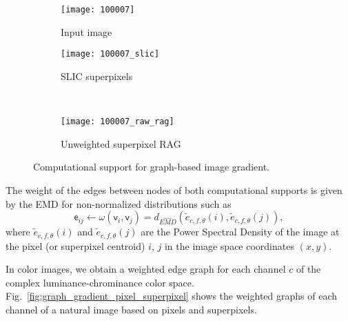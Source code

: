 \begin{figure}[!ht]
    \centering
    \begin{subfigure}[b]{0.49\textwidth}
    	\texttt{[image: 100007]} 
    	\caption{Input image}
    \end{subfigure}    
    \begin{subfigure}[b]{0.49\textwidth}
        \texttt{[image: 100007\_slic]}
        \caption{SLIC superpixels}
    \end{subfigure}\\    
    \begin{subfigure}[b]{0.49\textwidth}
        \texttt{[image: 100007\_raw\_rag]}
        \caption{Unweighted superpixel RAG}
    \end{subfigure}
    
	\caption{Computational support for graph-based image gradient.}\label{fig:computational_support}    
\end{figure}

The weight of the edges between nodes of both computational supports is given by the EMD for non-normalized distributions such as 
\begin{equation}
	\mathsf{e}_{ij} \leftarrow \omega(\mathsf{v}_i, \mathsf{v}_j) = d_{\widehat{EMD}}(\widetilde{e}_{c, f, \theta}(i), \widetilde{e}_{c, f, \theta}(j)),
\end{equation}
where $\widetilde{e}_{c, f, \theta}(i)$ and $\widetilde{e}_{c, f, \theta}(j)$ are the Power Spectral Density of the image at the pixel (or superpixel centroid) $i$, $j$ in the image space coordinates $(x,y)$. 

In color images, we obtain a weighted edge graph for each channel $c$ of the complex luminance-chrominance color space. Fig.\ \ref{fig:graph_gradient_pixel_superpixel} shows the weighted graphs of each channel of a natural image based on pixels and superpixels. 

